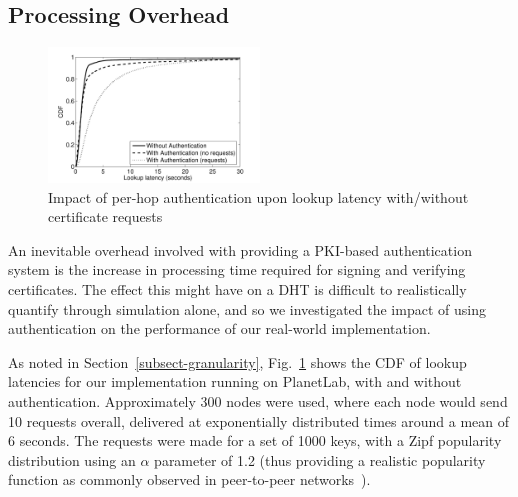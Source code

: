 \documentclass{elsart3p}
\begin{document}
\subsection{Processing Overhead}
\label{subsect-processing}
\begin{figure}[tb]
\centering \includegraphics[width=0.5\textwidth]{./diagrams/latency}
\caption{Impact of per-hop authentication upon lookup latency
with/without certificate requests} \label{fig:implatency}
\end{figure}



%


An inevitable overhead involved with providing a PKI-based
authentication system is the increase in processing time required
for signing and verifying certificates. The effect this might have
on a DHT is difficult to realistically quantify through simulation
alone, and so we investigated the impact of using authentication on
the performance of our real-world implementation.

As noted in Section~\ref{subsect-granularity},
Fig.~\ref{fig:implatency} shows the CDF of lookup latencies for our
implementation running on PlanetLab, with and without
authentication. Approximately 300 nodes were used, where
each node would send 10 requests overall, delivered at exponentially
distributed times around a mean of 6 seconds. The requests were made
for a set of 1000 keys, with a Zipf popularity distribution using an
$\alpha$ parameter of 1.2 (thus providing a realistic popularity
function as commonly observed in peer-to-peer networks~\cite{zipf}).
\end{document}
